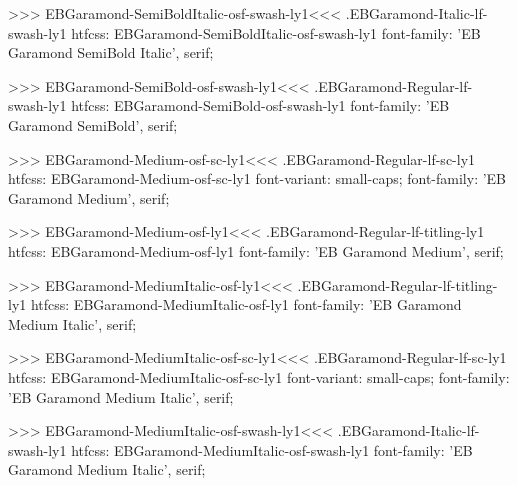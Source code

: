 {{>>>
\<EBGaramond-SemiBoldItalic-osf-swash-ly1\><<<
.EBGaramond-Italic-lf-swash-ly1
htfcss:  EBGaramond-SemiBoldItalic-osf-swash-ly1  font-family: 'EB Garamond SemiBold Italic', serif;

>>>
\<EBGaramond-SemiBold-osf-swash-ly1\><<<
.EBGaramond-Regular-lf-swash-ly1
htfcss:  EBGaramond-SemiBold-osf-swash-ly1  font-family: 'EB Garamond SemiBold', serif;

>>>
\<EBGaramond-Medium-osf-sc-ly1\><<<
.EBGaramond-Regular-lf-sc-ly1
htfcss:  EBGaramond-Medium-osf-sc-ly1  font-variant: small-caps; font-family: 'EB Garamond Medium', serif;

>>>
\<EBGaramond-Medium-osf-ly1\><<<
.EBGaramond-Regular-lf-titling-ly1
htfcss:  EBGaramond-Medium-osf-ly1  font-family: 'EB Garamond Medium', serif;

>>>
\<EBGaramond-MediumItalic-osf-ly1\><<<
.EBGaramond-Regular-lf-titling-ly1
htfcss:  EBGaramond-MediumItalic-osf-ly1  font-family: 'EB Garamond Medium Italic', serif;

>>>
\<EBGaramond-MediumItalic-osf-sc-ly1\><<<
.EBGaramond-Regular-lf-sc-ly1
htfcss:  EBGaramond-MediumItalic-osf-sc-ly1  font-variant: small-caps; font-family: 'EB Garamond Medium Italic', serif;

>>>
\<EBGaramond-MediumItalic-osf-swash-ly1\><<<
.EBGaramond-Italic-lf-swash-ly1
htfcss:  EBGaramond-MediumItalic-osf-swash-ly1  font-family: 'EB Garamond Medium Italic', serif;

}}
